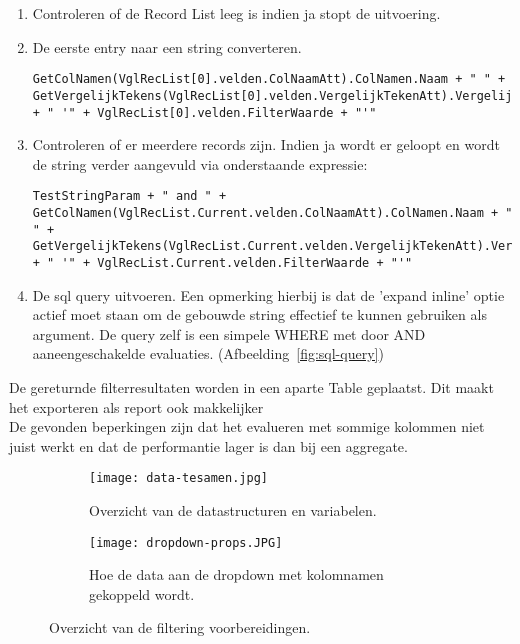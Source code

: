 \begin{itemize}
    \begin{enumerate}
        \item Controleren of de Record List leeg is indien ja stopt de uitvoering.
        \item De eerste entry naar een string converteren. 
\begin{lstlisting}
GetColNamen(VglRecList[0].velden.ColNaamAtt).ColNamen.Naam + " " + GetVergelijkTekens(VglRecList[0].velden.VergelijkTekenAtt).VergelijkTekens.Teken + " '" + VglRecList[0].velden.FilterWaarde + "'"
\end{lstlisting}
        \item Controleren of er meerdere records zijn. Indien ja wordt er geloopt en wordt de string verder aangevuld via onderstaande expressie:
\begin{lstlisting}
TestStringParam + " and " + GetColNamen(VglRecList.Current.velden.ColNaamAtt).ColNamen.Naam + " " + GetVergelijkTekens(VglRecList.Current.velden.VergelijkTekenAtt).VergelijkTekens.Teken + " '" + VglRecList.Current.velden.FilterWaarde + "'"
\end{lstlisting}
        \item De sql query uitvoeren. Een opmerking hierbij is dat de 'expand inline' optie actief moet staan om de gebouwde string effectief te kunnen gebruiken als argument. De query zelf is een simpele WHERE met door AND aaneengeschakelde evaluaties. (Afbeelding~\ref{fig:sql-query})
    \end{enumerate}
    De gereturnde filterresultaten worden in een aparte Table geplaatst. Dit maakt het exporteren als report ook makkelijker\\
    De gevonden beperkingen zijn dat het evalueren met sommige kolommen niet juist werkt en dat de performantie lager is dan bij een aggregate.
\end{itemize}


\begin{figure}[h!]
    \centering
    \begin{subfigure}[b]{0.3\linewidth}
        \texttt{[image: data-tesamen.jpg]}
        \caption{Overzicht van de datastructuren en variabelen.}
    \end{subfigure}
    \begin{subfigure}[b]{0.5\linewidth}
        \texttt{[image: dropdown-props.JPG]}
        \caption{Hoe de data aan de dropdown met kolomnamen gekoppeld wordt.}
    \end{subfigure}
    \caption{Overzicht van de filtering voorbereidingen.}
    \label{fig:data-en-dropdown}
\end{figure}

